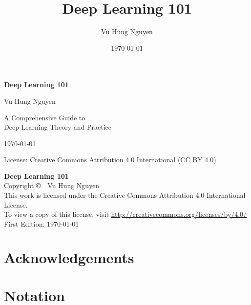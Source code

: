 \documentclass[10pt,\papersize,twoside,openright]{book}
\title{\textbf{Deep Learning 101}}
\author{Vu Hung Nguyen}
\date{\today}
\theoremstyle{definition}
\theoremstyle{remark}
\begin{document}
\frontmatter

\begin{titlepage}
    \centering
    \vspace*{2cm}
    
    {\Huge\bfseries Deep Learning 101\par}
    \vspace{1.5cm}
    
    {\Large Vu Hung Nguyen\par}
    \vspace{2cm}
    
    {\large A Comprehensive Guide to\\
    Deep Learning Theory and Practice\par}
    
    \vfill
    
    {\large \today\par}
    \vspace{0.5cm}
    
    {\small License: Creative Commons Attribution 4.0 International (CC BY 4.0)\par}
\end{titlepage}

\newpage
\thispagestyle{empty}
\vspace*{\fill}
\begin{flushleft}
\textbf{Deep Learning 101}\\
Copyright \copyright~\the\year~Vu Hung Nguyen\\[0.5em]
This work is licensed under the Creative Commons Attribution 4.0 International License.\\
To view a copy of this license, visit \url{http://creativecommons.org/licenses/by/4.0/}\\[0.5em]
First Edition: \today
\end{flushleft}
\vspace*{\fill}
\clearpage

\tableofcontents

\chapter*{Acknowledgements}


\chapter*{Notation}

\end{document}
